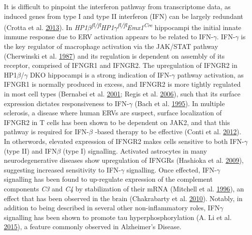 \documentclass[onehalf,12pt]{beavtex}
\begin{document}
  It is difficult to pinpoint the interferon pathway from transcriptome
  data, as induced genes from type I and type II interferon (IFN) can be
  largely redundant (Crotta et al.
  \protect\hyperlink{ref-CrottaTypetypeIII2013}{2013}). In
  \emph{HP1\(\beta\)\textsuperscript{fl/fl}HP1\(\gamma\)\textsuperscript{fl/fl}Emx1\textsuperscript{Cre}}
  hippocampi the initial innate immune response due to ERV activation
  appears to be related to IFN-\(\gamma\). IFN-\(\gamma\) is the key
  regulator of macrophage activation via the JAK/STAT pathway (Cherwinski
  et al. \protect\hyperlink{ref-CherwinskiTwotypesmouse1987}{1987}) and
  its regulation is dependent on assembly of its receptor, comprised of
  IFNGR1 and IFNGR2. The upregulation of IFNGR2 in HP1\(\beta\)/\(\gamma\)
  DKO hippocampi is a strong indication of IFN-\(\gamma\) pathway
  activation, as IFNGR1 is normally produced in excess, and IFNGR2 is more
  tightly regulated in most cell types (Bernabei et al.
  \protect\hyperlink{ref-BernabeiInterferongreceptorexpression2001}{2001};
  Regis et al.
  \protect\hyperlink{ref-RegisIFNgR2traffickingtunes2006}{2006}), such
  that its surface expression dictates responsiveness to IFN-\(\gamma\)
  (Bach et al.
  \protect\hyperlink{ref-BachLigandInducedAutoregulationIFNg1995}{1995}).
  In multiple sclerosis, a disease where human ERVs are suspect, surface
  localization of IFNGR2 in T cells has been shown to be dependent on
  JAK2, and that this pathway is required for IFN-\(\beta\) -based therapy
  to be effective (Conti et al.
  \protect\hyperlink{ref-ContiTh17CellsMultiple2012}{2012}). In
  otherwords, elevated expression of IFNGR2 makes cells sensitive to both
  IFN-\(\gamma\) (type II) and IFN\(\beta\) (type I) signalling. Activated
  astrocytes in many neurodegenerative diseases show upregulation of
  IFNGRs (Hashioka et al.
  \protect\hyperlink{ref-HashiokaInterferongdependentcytotoxicactivation2009}{2009}),
  suggesting increased sensitivity to IFN-\(\gamma\) signalling. Once
  effected, IFN-\(\gamma\) signalling has been found to up-regulate
  expression of the complement components \emph{C3} and \emph{C4} by
  stabilization of their mRNA (Mitchell et al.
  \protect\hyperlink{ref-MitchellIFNgammaupregulatesexpression1996}{1996}),
  an effect that has been observed in the brain (Chakrabarty et al.
  \protect\hyperlink{ref-ChakrabartyIFNgPromotesComplement2010}{2010}).
  Notably, in addition to being described in several other
  non-inflammatory roles, IFN\(\gamma\) signalling has been shown to
  promote tau hyperphosphorylation (A. Li et al.
  \protect\hyperlink{ref-LiIFNgpromotesphosphorylation2015}{2015}), a
  feature commonly observed in Alzheimer's Disease.
  
\end{document}
